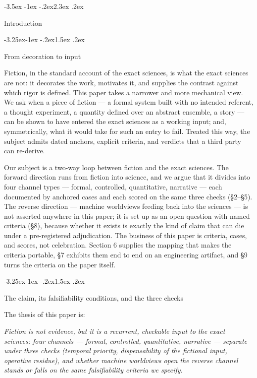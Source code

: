 \documentclass[11pt,a4paper]{article}
\makeatletter
\renewcommand\section{\@startsection{section}{1}{\z@}%
  {-3.5ex \@plus -1ex \@minus -.2ex}{2.3ex \@plus .2ex}%
  {\normalfont\Large\bfseries\raggedright}}
\renewcommand\subsection{\@startsection{subsection}{2}{\z@}%
  {-3.25ex\@plus -1ex \@minus -.2ex}{1.5ex \@plus .2ex}%
  {\normalfont\large\bfseries\raggedright}}
\makeatother
\begin{document}
\section{Introduction}

\subsection{From decoration to input}

Fiction, in the standard account of the exact sciences, is what the exact sciences are not: it decorates the work, motivates it, and supplies the contrast against which rigor is defined. This paper takes a narrower and more mechanical view. We ask when a piece of fiction — a formal system built with no intended referent, a thought experiment, a quantity defined over an abstract ensemble, a story — can be shown to have entered the exact sciences as a working input; and, symmetrically, what it would take for such an entry to fail. Treated this way, the subject admits dated anchors, explicit criteria, and verdicts that a third party can re-derive.

Our subject is a two-way loop between fiction and the exact sciences. The forward direction runs from fiction into science, and we argue that it divides into four channel types — formal, controlled, quantitative, narrative — each documented by anchored cases and each scored on the same three checks (§2–§5). The reverse direction — machine worldviews feeding back into the sciences — is not asserted anywhere in this paper; it is set up as an open question with named criteria (§8), because whether it exists is exactly the kind of claim that can die under a pre-registered adjudication. The business of this paper is criteria, cases, and scores, not celebration. Section 6 supplies the mapping that makes the criteria portable, §7 exhibits them end to end on an engineering artifact, and §9 turns the criteria on the paper itself.

\subsection{The claim, its falsifiability conditions, and the three checks}

The thesis of this paper is:

\textit{Fiction is not evidence, but it is a recurrent, checkable input to the exact sciences: four channels — formal, controlled, quantitative, narrative — separate under three checks (temporal priority, dispensability of the fictional input, operative residue), and whether machine worldviews open the reverse channel stands or falls on the same falsifiability criteria we specify.}
\end{document}
